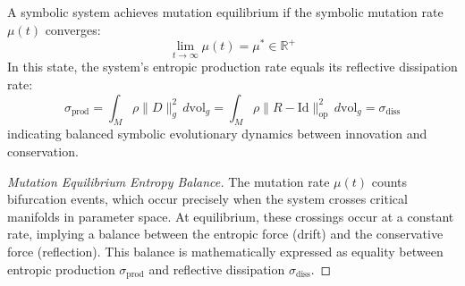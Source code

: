 \begin{proposition}
\label{prop:bk6_mutation_equilibrium}
A symbolic system achieves mutation equilibrium if the symbolic mutation rate $\mu(t)$ converges:
\begin{equation}
\lim_{t \to \infty} \mu(t) = \mu^* \in \mathbb{R}^+
\end{equation}
In this state, the system's entropic production rate equals its reflective dissipation rate:
\begin{equation}
\sigma_{\text{prod}} = \int_M \rho \|D\|_g^2 \, d\text{vol}_g = \int_M \rho \|R - \text{Id}\|_{\text{op}}^2 \, d\text{vol}_g = \sigma_{\text{diss}}
\end{equation}
indicating balanced symbolic evolutionary dynamics between innovation and conservation.
\begin{proof}[Mutation Equilibrium Entropy Balance]
\label{proof:bk6_mutation_equilibrium_entropy_balance}
The mutation rate $\mu(t)$ counts bifurcation events, which occur precisely when the system crosses critical manifolds in parameter space. At equilibrium, these crossings occur at a constant rate, implying a balance between the entropic force (drift) and the conservative force (reflection). This balance is mathematically expressed as equality between entropic production $\sigma_{\text{prod}}$ and reflective dissipation $\sigma_{\text{diss}}$.
\end{proof}
\end{proposition}
